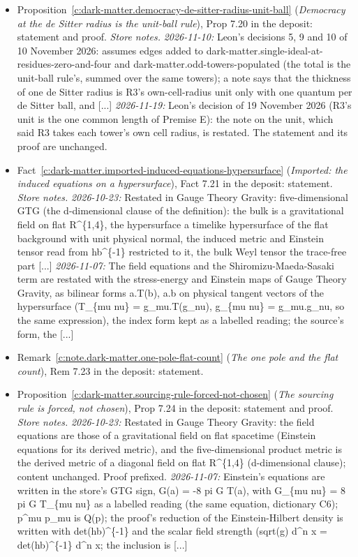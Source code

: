\documentclass[11pt]{article}
\theoremstyle{definition}
\theoremstyle{plain}
\begin{document}
\begin{itemize}
\item Proposition~\ref{c:dark-matter.democracy-de-sitter-radius-unit-ball} (\emph{Democracy at the de Sitter radius is the unit-ball rule}), Prop 7.20 in the deposit: statement and proof. \emph{Store notes.} \emph{2026-11-10:} Leon's decisions 5, 9 and 10 of 10 November 2026: assumes edges added to dark-matter.single-ideal-at-residues-zero-and-four and dark-matter.odd-towers-populated (the total is the unit-ball rule's, summed over the same towers); a note says that the thickness of one de Sitter radius is R3's own-cell-radius unit only with one quantum per de Sitter ball, and [...] \emph{2026-11-19:} Leon's decision of 19 November 2026 (R3's unit is the one common length of Premise E): the note on the unit, which said R3 takes each tower's own cell radius, is restated. The statement and its proof are unchanged.
\item Fact~\ref{c:dark-matter.imported-induced-equations-hypersurface} (\emph{Imported: the induced equations on a hypersurface}), Fact 7.21 in the deposit: statement. \emph{Store notes.} \emph{2026-10-23:} Restated in Gauge Theory Gravity: five-dimensional GTG (the d-dimensional clause of the definition): the bulk is a gravitational field on flat R\^{}\{1,4\}, the hypersurface a timelike hypersurface of the flat background with unit physical normal, the induced metric and Einstein tensor read from hb\^{}\{-1\} restricted to it, the bulk Weyl tensor the trace-free part [...] \emph{2026-11-07:} The field equations and the Shiromizu-Maeda-Sasaki term are restated with the stress-energy and Einstein maps of Gauge Theory Gravity, as bilinear forms a.T(b), a.b on physical tangent vectors of the hypersurface (T\_\{mu nu\} = g\_mu.T(g\_nu), g\_\{mu nu\} = g\_mu.g\_nu, so the same expression), the index form kept as a labelled reading; the source's form, the [...]
\item Remark~\ref{c:note.dark-matter.one-pole-flat-count} (\emph{The one pole and the flat count}), Rem 7.23 in the deposit: statement.
\item Proposition~\ref{c:dark-matter.sourcing-rule-forced-not-chosen} (\emph{The sourcing rule is forced, not chosen}), Prop 7.24 in the deposit: statement and proof. \emph{Store notes.} \emph{2026-10-23:} Restated in Gauge Theory Gravity: the field equations are those of a gravitational field on flat spacetime (Einstein equations for its derived metric), and the five-dimensional product metric is the derived metric of a diagonal field on flat R\^{}\{1,4\} (d-dimensional clause); content unchanged. Proof prefixed. \emph{2026-11-07:} Einstein's equations are written in the store's GTG sign, G(a) = -8 pi G T(a), with G\_\{mu nu\} = 8 pi G T\_\{mu nu\} as a labelled reading (the same equation, dictionary C6); p\^{}mu p\_mu is Q(p); the proof's reduction of the Einstein-Hilbert density is written with det(hb)\^{}\{-1\} and the scalar field strength (sqrt(g) d\^{}n x = det(hb)\^{}\{-1\} d\^{}n x; the inclusion is [...]

\end{itemize}
\end{document}
